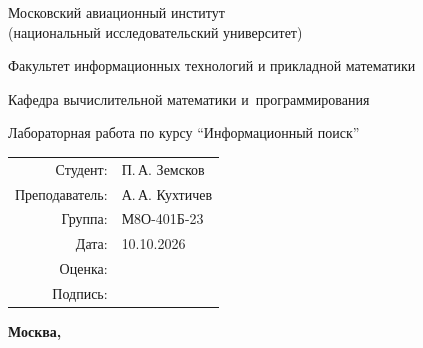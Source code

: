 \begin{titlepage}
\begin{center}
\bfseries

{\Large Московский авиационный институт\\ (национальный исследовательский университет)

}

\vspace{48pt}

{\large Факультет информационных технологий и прикладной математики
}

\vspace{36pt}

{\large Кафедра вычислительной математики и~программирования

}


\vspace{48pt}

Лабораторная работа  по курсу \enquote{Информационный поиск}

\end{center}

\vspace{72pt}

\begin{flushright}
\begin{tabular}{rl}
Студент: & П.\,А. Земсков \\
Преподаватель: & А.\,А. Кухтичев \\
Группа: & М8О-401Б-23 \\
Дата: & 10.10.2026 \\
Оценка: & \\
Подпись: & \\
\end{tabular}
\end{flushright}

\vfill

\begin{center}
\bfseries
Москва, \the\year
\end{center}
\end{titlepage}

\pagebreak
